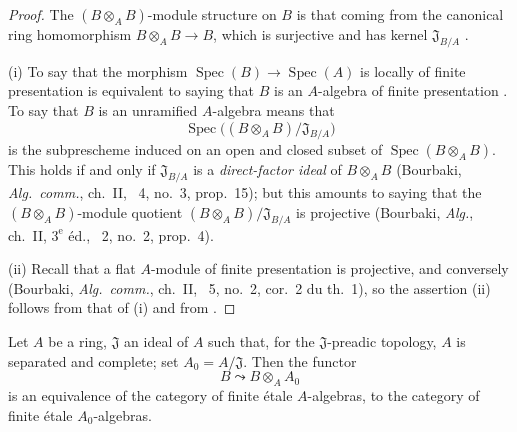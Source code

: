 \begin{proof}
The $(B\otimes_A B)$-module structure on $B$ is that coming from the canonical ring homomorphism $B\otimes_A B\to B$, which is surjective and has kernel $\mathfrak{J}_{B/A}$ .

(i) To say that the morphism $\operatorname{Spec}(B)\to\operatorname{Spec}(A)$ is locally of finite presentation is equivalent to saying that $B$ is an $A$-algebra of finite presentation .  To say that $B$ is an unramified $A$-algebra means  that
\[
 \operatorname{Spec}\bigl((B\otimes_A B)/\mathfrak{J}_{B/A}\bigr)
\]
is the subprescheme induced on an open and closed subset of $\operatorname{Spec}(B\otimes_A B)$.  This holds if and only if $\mathfrak{J}_{B/A}$ is a \emph{direct-factor ideal} of $B\otimes_A B$ (Bourbaki, \emph{Alg.\ comm.}, ch.~II, \textsection~4, no.~3, prop.~15);
but this amounts to saying that the $(B\otimes_A B)$-module quotient $(B\otimes_A B)/\mathfrak{J}_{B/A}$ is projective (Bourbaki, \emph{Alg.}, ch.~II, $3^{\text{e}}$ \'ed., \textsection~2, no.~2, prop.~4).

(ii) Recall that a flat $A$-module of finite presentation is projective, and conversely (Bourbaki, \emph{Alg.\ comm.}, ch.~II, \textsection~5, no.~2, cor.~2 du th.~1), so the assertion (ii) follows from that of (i) and from .
\end{proof}

\begin{proposition}[18.3.2]
\label{IV.18.3.2}
Let $A$ be a ring, $\mathfrak{J}$ an ideal of $A$ such that, for the $\mathfrak{J}$-preadic topology, $A$ is separated and complete;
set $A_0=A/\mathfrak{J}$.
Then the functor
\[
B\leadsto B\otimes_A A_0
\]
is an equivalence of the category of finite \'etale $A$-algebras, to the category of finite \'etale $A_0$-algebras.
\end{proposition}

